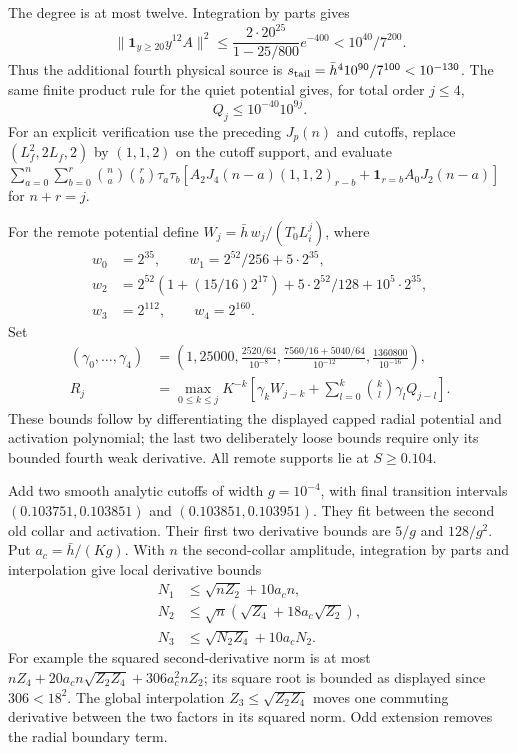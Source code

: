 \documentclass[11pt]{article}
\theoremstyle{definition}\newtheorem{definition}[theorem]{Definition}
\theoremstyle{remark}\newtheorem{remark}[theorem]{Remark}
\newcommand{\one}{\mathbf1}\newcommand{\R}{\mathbb R}\newcommand{\T}{\mathbb T}
\begin{document}
The degree is at most twelve. Integration by parts gives
\[
 \|\one_{y\ge20}y^{12}A\|^2
 \le\frac{2\cdot20^{25}}{1-25/800}e^{-400}
 <10^{40}/7^{200}.
\]
Thus the additional fourth physical source is
$s_{\rm tail}=\bar h^4 10^{90}/7^{100}<10^{-130}$.
The same finite product rule for the quiet potential gives, for total
order $j\le4$,
\begin{equation}
 Q_j\le10^{-40}10^{9j}. \label{prep:quiet-high}
\end{equation}
For an explicit verification use the preceding $J_p(n)$ and cutoffs,
replace $(L_f^2,2L_f,2)$ by $(1,1,2)$ on the cutoff support,
and evaluate
$\sum_{a=0}^n\sum_{b=0}^r\binom na\binom rb
\tau_a\tau_b[A_2J_4(n-a)(1,1,2)_{r-b}
+\one_{r=b}A_0J_2(n-a)]$ for $n+r=j$.

For the remote potential define $W_j=\bar h\,w_j/(T_0L_i^j)$, where
\begin{align*}
 w_0&=2^{35},\qquad w_1=2^{52}/256+5\cdot2^{35},\\
 w_2&=2^{52}(1+(15/16)2^{17})+5\cdot2^{52}/128+10^5\cdot2^{35},\\
 w_3&=2^{112},\qquad w_4=2^{160}.
\end{align*}
Set
\begin{align*}
 (\gamma_0,\ldots,\gamma_4)&=\left(1,25000,
 \frac{2520/64}{10^{-8}},
 \frac{7560/16+5040/64}{10^{-12}},
 \frac{1360800}{10^{-16}}\right),\\
 R_j&=\max_{0\le k\le j}K^{-k}
 \left[\gamma_kW_{j-k}+
       \sum_{l=0}^k\binom kl\gamma_lQ_{j-l}\right].
\end{align*}
These bounds follow by differentiating the displayed capped radial
potential and activation polynomial; the last two deliberately loose
bounds require only its bounded fourth weak derivative. All remote
supports lie at $S\ge0.104$.

Add two smooth analytic cutoffs of width $g=10^{-4}$, with final
transition intervals $(0.103751,0.103851)$ and
$(0.103851,0.103951)$. They fit between the second old collar and
activation. Their first two derivative bounds are $5/g$ and $128/g^2$.
Put $a_c=\bar h/(Kg)$. With $n$ the second-collar amplitude, integration
by parts and interpolation give local derivative bounds
\begin{align}
 N_1&\le\sqrt{nZ_2}+10a_cn,\\
 N_2&\le\sqrt n(\sqrt{Z_4}+18a_c\sqrt{Z_2}),\\
 N_3&\le\sqrt{N_2Z_4}+10a_cN_2. \label{prep:local-high}
\end{align}
For example the squared second-derivative norm is at most
$nZ_4+20a_cn\sqrt{Z_2Z_4}+306a_c^2nZ_2$; its square root is
bounded as displayed since $306<18^2$. The global interpolation
$Z_3\le\sqrt{Z_2Z_4}$ moves one commuting derivative between the
two factors in its squared norm. Odd extension removes the radial
boundary term.
\end{document}
